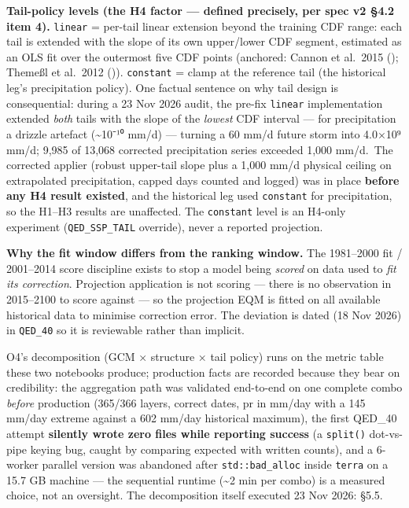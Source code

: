\documentclass[
  english,
  11pt,
]{article}
\begin{document}
\textbf{Tail-policy levels (the H4 factor --- defined precisely, per
spec v2 §4.2 item 4).} \texttt{linear} = per-tail linear extension
beyond the training CDF range: each tail is extended with the slope of
its own upper/lower CDF segment, estimated as an OLS fit over the
outermost five CDF points (anchored: Cannon et al.~2015
(); Themeßl et al.~2012
()).
\texttt{constant} = clamp at the reference tail (the historical leg's
precipitation policy). One factual sentence on why tail design is
consequential: during a 23 Nov 2026 audit, the pre-fix \texttt{linear}
implementation extended \emph{both} tails with the slope of the
\emph{lowest} CDF interval --- for precipitation a drizzle artefact
(\textasciitilde10⁻¹⁰ mm/d) --- turning a 60 mm/d future storm into
4.0×10⁹ mm/d; 9,985 of 13,068 corrected precipitation series exceeded
1,000 mm/d.~The corrected applier (robust upper-tail slope plus a 1,000
mm/d physical ceiling on extrapolated precipitation, capped days counted
and logged) was in place \textbf{before any H4 result existed}, and the
historical leg used \texttt{constant} for precipitation, so the H1--H3
results are unaffected. The \texttt{constant} level is an H4-only
experiment (\texttt{QED\_SSP\_TAIL} override), never a reported
projection.

\textbf{Why the fit window differs from the ranking window.} The
1981--2000 fit / 2001--2014 score discipline exists to stop a model
being \emph{scored} on data used to \emph{fit its correction}.
Projection application is not scoring --- there is no observation in
2015--2100 to score against --- so the projection EQM is fitted on all
available historical data to minimise correction error. The deviation is
dated (18 Nov 2026) in \texttt{QED\_40} so it is reviewable rather than
implicit.

O4's decomposition (GCM × structure × tail policy) runs on the metric
table these two notebooks produce; production facts are recorded because
they bear on credibility: the aggregation path was validated end-to-end
on one complete combo \emph{before} production (365/366 layers, correct
dates, pr in mm/day with a 145 mm/day extreme against a 602 mm/day
historical maximum), the first QED\_40 attempt \textbf{silently wrote
zero files while reporting success} (a \texttt{split()} dot-vs-pipe
keying bug, caught by comparing expected with written counts), and a
6-worker parallel version was abandoned after \texttt{std::bad\_alloc}
inside \texttt{terra} on a 15.7 GB machine --- the sequential runtime
(\textasciitilde2 min per combo) is a measured choice, not an oversight.
The decomposition itself executed 23 Nov 2026: §5.5.
\end{document}
